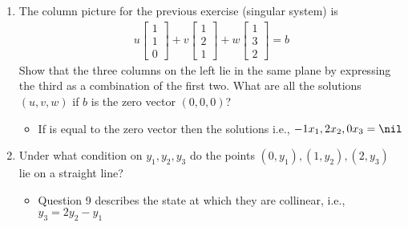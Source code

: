 \begin{itemize}
\begin{enumerate}
    \item The column picture for the previous exercise (singular system) is
      \begin{align*}
        u \begin{bmatrix} 1 \\ 1 \\ 0 \end{bmatrix} +
        v \begin{bmatrix} 1 \\ 2 \\ 1 \end{bmatrix} +
        w \begin{bmatrix} 1 \\ 3 \\ 2 \end{bmatrix} = b
      \end{align*}
      Show that the three columns on the left lie in the same plane by
      expressing the third as a combination of the first two. What are all the
      solutions \( (u,v,w) \) if \(b\) is the zero vector \( (0,0,0) \)?
      \begin{itemize}\color{foreground}
        \item If is  equal to the zero vector \nil then the solutions
           i.e., \( -1x_1, 2x_2, 0x_3  = \nil\)
      \end{itemize}

    \item Under what condition on \( y_1, y_2, y_3 \) do the points \((0,y_1),
      (1,y_2), (2,y_3)\) lie on a straight line?
      \begin{itemize}\color{foreground}
        \item Question 9 describes the state at which they are collinear, i.e.,
          \( y_3 = 2y_2 - y_1 \)
      \end{itemize}



\end{enumerate}
\end{itemize}

